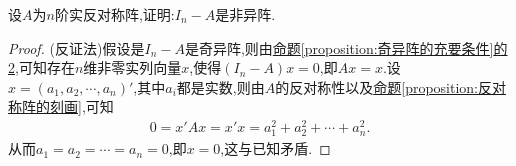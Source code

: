 \documentclass[../../main.tex]{subfiles}%
\begin{document}
\begin{example}
设\(A\)为\(n\)阶实反对称阵,证明:\(I_n - A\)是非异阵.
\end{example}
\begin{proof}

(反证法)假设是$I_n-A$是奇异阵,则由\hyperref[proposition:奇异阵的充要条件2]{命题\ref{proposition:奇异阵的充要条件}的2},可知存在\(n\)维非零实列向量\(x\),使得\((I_n - A)x = 0\),即\(Ax = x\).设\(x = (a_1,a_2,\cdots,a_n)'\),其中\(a_i\)都是实数,则由\(A\)的反对称性以及\hyperref[proposition:反对称阵的刻画]{命题\ref{proposition:反对称阵的刻画}},可知
\begin{align*}
0 = x'Ax = x'x = a_1^2 + a_2^2 + \cdots + a_n^2.
\end{align*}
从而\(a_1 = a_2 = \cdots = a_n = 0\),即\(x = 0\),这与已知矛盾.

\end{proof}
\end{document}
